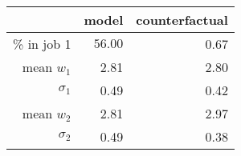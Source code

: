 \begin{table}[!h]
\centering
 \caption{} 
\begin{tabular}{rrr}
\toprule
 & \textbf{model} & \textbf{counterfactual}\\
\midrule
\% in job 1 & $56.00$ & 0.67\\
mean $w_1$ & 2.81 & 2.80\\
$\sigma_1$ & 0.49 & 0.42\\
mean $w_2$ & 2.81 & 2.97\\
$\sigma_2$ & 0.49 & 0.38\\
\bottomrule
\end{tabular}
\end{table}